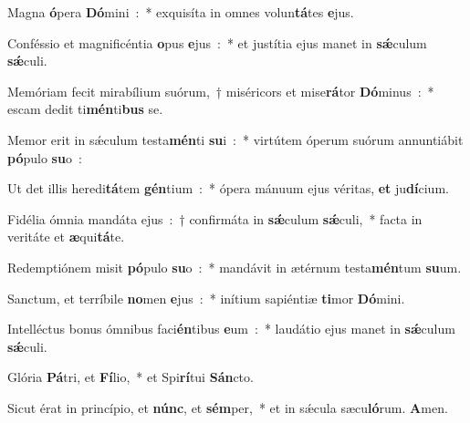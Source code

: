 ﻿\item Magna \textbf{ó}\-pera \textbf{Dó}\-mini~:~* exquisíta in omnes vo\-lun\-\textbf{tá}\-tes \textbf{e}\-jus.
\item Conféssio et magnificéntia \textbf{o}\-pus \textbf{e}\-jus~:~* et justítia ejus manet in \textbf{sǽ}\-culum \textbf{sǽ}\-culi.
\item Memóriam fecit mirabílium suórum,~† miséricors et mise\textbf{rá}\-tor \textbf{Dó}\-minus~:~* escam dedit ti\textbf{mén}\-ti\textbf{bus} se.
\item Memor erit in sǽculum testa\textbf{mén}\-ti \textbf{su}\-i~:~* virtútem óperum suórum annuntiábit \textbf{pó}\-pulo \textbf{su}\-o~:
\item Ut det illis heredi\textbf{tá}\-tem \textbf{gén}\-tium~:~* ópera mánuum ejus véritas, \textbf{et} ju\textbf{dí}\-cium.
\item Fidélia ómnia mandáta ejus~:~† confirmáta in \textbf{sǽ}\-cu\-lum \textbf{sǽ}\-culi,~* facta in veritáte et \textbf{æ}\-qui\textbf{tá}\-te.
\item Redemptiónem misit \textbf{pó}\-pulo \textbf{su}\-o~:~* mandávit in ætérnum testa\textbf{mén}\-tum \textbf{su}\-um.
\item Sanctum, et terríbile \textbf{no}\-men \textbf{e}\-jus~:~* inítium sapiéntiæ \textbf{ti}\-mor \textbf{Dó}\-mini.
\item Intelléctus bonus ómnibus faci\textbf{én}\-tibus \textbf{e}\-um~:~* laudátio ejus manet in \textbf{sǽ}\-culum \textbf{sǽ}\-culi.
\item Glória \textbf{Pá}\-tri, et \textbf{Fí}\-lio,~* et Spi\textbf{rí}\-tui \textbf{Sán}\-cto.
\item Sicut érat in princípio, et \textbf{núnc}, et \textbf{sém}\-per,~* et in sǽcula sæcu\textbf{ló}\-rum. \textbf{A}\-men.
